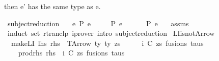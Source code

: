 \begin{isabellebody}
\begin{isamarkuptext}
  then e' has the same type as e.%
\end{isamarkuptext}\isamarkuptrue%
\isamarkupfalse%
\ subject{\isacharunderscore}{\kern0pt}reduction{\isacharprime}{\kern0pt}{\isacharcolon}{\kern0pt}\isanewline
\ \ \ {\isachardoublequoteopen}e\ {\isacharminus}{\kern0pt}{\isachargreater}{\kern0pt}{\isacharbraceleft}{\kern0pt}P{\isacharbraceright}{\kern0pt}{\isacharasterisk}{\kern0pt}\ e{\isacharprime}{\kern0pt}{\isachardoublequoteclose}\isanewline
\ \ \ \ {\isachardoublequoteopen}{\isasymGamma}\ {\isasymturnstile}{\isacharbraceleft}{\kern0pt}P{\isacharbraceright}{\kern0pt}\ e\ {\isacharcolon}{\kern0pt}\ {\isasymtau}{\isachardoublequoteclose}\isanewline
\ \ \ {\isachardoublequoteopen}{\isasymGamma}\ {\isasymturnstile}{\isacharbraceleft}{\kern0pt}P{\isacharbraceright}{\kern0pt}\ e{\isacharprime}{\kern0pt}\ {\isacharcolon}{\kern0pt}\ {\isasymtau}{\isachardoublequoteclose}\isanewline
%
\isadelimproof
%
\endisadelimproof
%
\isatagproof
{}\isamarkupfalse%
\ assms\isanewline
\ \ \isamarkupfalse%
\ {\isacharparenleft}{\kern0pt}induct\ set{\isacharcolon}{\kern0pt}\ rtranclp{\isacharparenright}{\kern0pt}\ {\isacharparenleft}{\kern0pt}iprover\ intro{\isacharcolon}{\kern0pt}\ subject{\isacharunderscore}{\kern0pt}reduction{\isacharparenright}{\kern0pt}{\isacharplus}{\kern0pt}%
\endisatagproof
{\isafoldproof}%
%
\isadelimproof
%
\endisadelimproof
%
\isadelimdocument
%
\endisadelimdocument
%
\isatagdocument
%
\isamarkuptrue%
%
\endisatagdocument
{\isafolddocument}%
%
\isadelimdocument
%
\endisadelimdocument
{}\isamarkupfalse%
\ LI{\isacharunderscore}{\kern0pt}isnot{\isacharunderscore}{\kern0pt}Arrow{\isacharcolon}{\kern0pt}\isanewline
\ \ {\isachardoublequoteopen}make{\isacharunderscore}{\kern0pt}LI\ {\isacharparenleft}{\kern0pt}lhs{\isacharcomma}{\kern0pt}\ rhs{\isacharparenright}{\kern0pt}\ {\isasymnoteq}\ TArrow\ ty{}\ ty{}\ zs{\isachardoublequoteclose}\isanewline
%
\isadelimproof
%
\endisadelimproof
%
\isatagproof
{}\isamarkupfalse%
\ {\isacharminus}{\kern0pt}\isanewline
\ \ \isamarkupfalse%
\ i\ C\ zs\ fusions\ taus\ \isanewline
\ \ \ \ prod{\isacharunderscore}{\kern0pt}rhs{\isacharcolon}{\kern0pt}\ {\isachardoublequoteopen}rhs\ {\isacharequal}{\kern0pt}\ {\isacharparenleft}{\kern0pt}i{\isacharcomma}{\kern0pt}\ {\isacharparenleft}{\kern0pt}C{\isacharcomma}{\kern0pt}\ zs{\isacharparenright}{\kern0pt}{\isacharcomma}{\kern0pt}\ fusions{\isacharcomma}{\kern0pt}\ taus{\isacharparenright}{\kern0pt}{\isachardoublequoteclose}\isanewline

\end{isabellebody}

